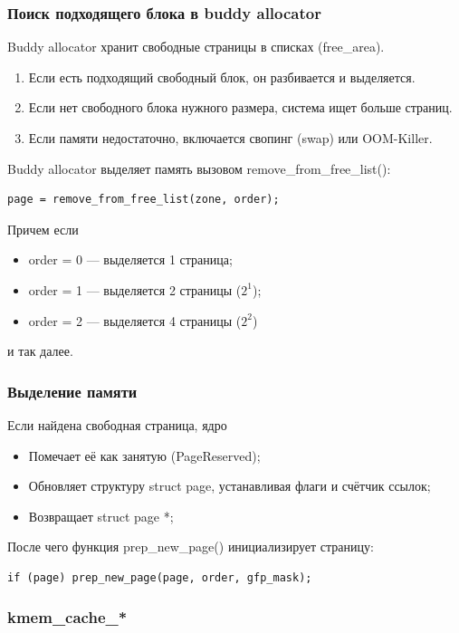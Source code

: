 \subsubsection*{Поиск подходящего блока в buddy allocator}

Buddy allocator хранит свободные страницы в списках (free\_area).

\begin{enumerate}
    \item Если есть подходящий свободный блок, он разбивается и выделяется.
    \item Если нет свободного блока нужного размера, система ищет больше страниц.
    \item Если памяти недостаточно, включается свопинг (swap) или OOM-Killer.
\end{enumerate}

Buddy allocator выделяет память вызовом remove\_from\_free\_list():
\begin{lstlisting}
page = remove_from_free_list(zone, order);
\end{lstlisting}

Причем если
\begin{itemize}
    \item order = 0 --- выделяется 1 страница;
    \item order = 1 --- выделяется 2 страницы ($2^1$);
    \item order = 2 --- выделяется 4 страницы ($2^2$)
\end{itemize}
и так далее.

\subsubsection*{Выделение памяти}

Если найдена свободная страница, ядро
\begin{itemize}
\item Помечает её как занятую (PageReserved);
\item Обновляет структуру struct page, устанавливая флаги и счётчик ссылок;
\item Возвращает struct page *;
\end{itemize}

После чего функция prep\_new\_page() инициализирует страницу:
\begin{lstlisting}
if (page) prep_new_page(page, order, gfp_mask);
\end{lstlisting}

\subsubsection{kmem\_cache\_*}

